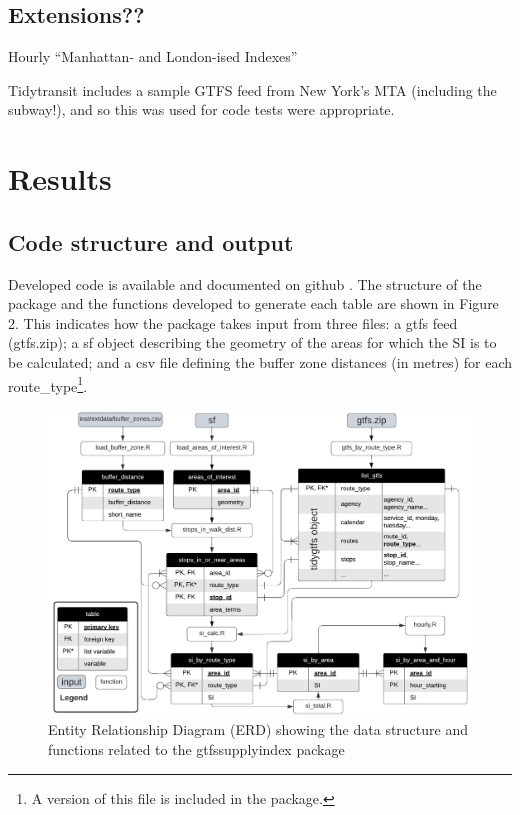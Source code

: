\documentclass[preprint, 3p,
authoryear]{elsarticle} %
\begin{document}
\hypertarget{extensions}{%
\subsection{Extensions??}\label{extensions}}

Hourly ``Manhattan- and London-ised Indexes''

Tidytransit includes a sample GTFS feed from New York's MTA (including
the subway!), and so this was used for code tests were appropriate.

\hypertarget{results}{%
\section{Results}\label{results}}

\hypertarget{code-structure-and-output}{%
\subsection{Code structure and output}\label{code-structure-and-output}}

Developed code is available and documented on github
\citep{gtfssupplyindex_github}. The structure of the package and the
functions developed to generate each table are shown in Figure 2. This
indicates how the package takes input from three files: a gtfs feed
(gtfs.zip); a sf object describing the geometry of the areas for which
the SI is to be calculated; and a csv file defining the buffer zone
distances (in metres) for each route\_type\footnote{A version of this
  file is included in the package.}.

\begin{figure}
\includegraphics[width=1\linewidth]{graphics/SI_data_structure} \caption{Entity Relationship Diagram (ERD) showing the data structure and functions related to the gtfssupplyindex package}\label{fig:SI_ERD}
\end{figure}
\end{document}
